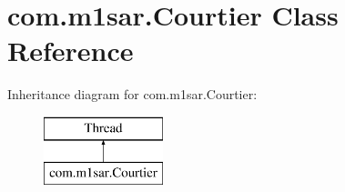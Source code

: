 \hypertarget{classcom_1_1m1sar_1_1_courtier}{}\section{com.\+m1sar.\+Courtier Class Reference}
\label{classcom_1_1m1sar_1_1_courtier}
Inheritance diagram for com.\+m1sar.\+Courtier\+:\begin{figure}[H]
\begin{center}
\leavevmode
\includegraphics[height=2.000000cm]{classcom_1_1m1sar_1_1_courtier}
\end{center}
\end{figure}

